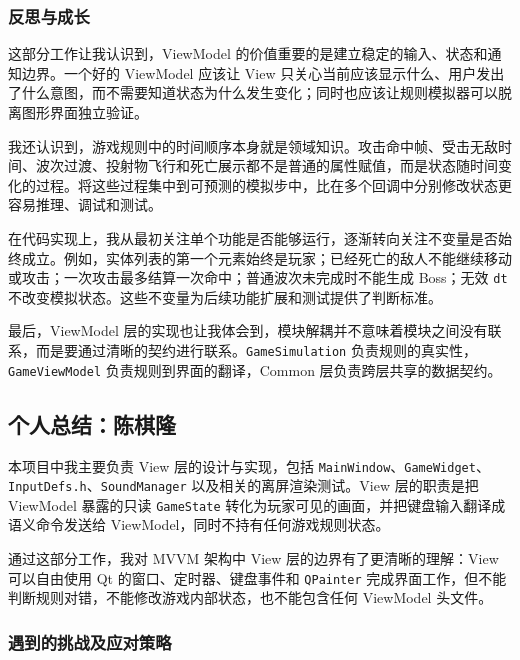 \documentclass[a4paper]{article}
\begin{document}
\subsubsection{反思与成长}
这部分工作让我认识到，ViewModel 的价值重要的是建立稳定的输入、状态和通知边界。一个好的 ViewModel 应该让 View 只关心当前应该显示什么、用户发出了什么意图，而不需要知道状态为什么发生变化；同时也应该让规则模拟器可以脱离图形界面独立验证。

我还认识到，游戏规则中的时间顺序本身就是领域知识。攻击命中帧、受击无敌时间、波次过渡、投射物飞行和死亡展示都不是普通的属性赋值，而是状态随时间变化的过程。将这些过程集中到可预测的模拟步中，比在多个回调中分别修改状态更容易推理、调试和测试。

在代码实现上，我从最初关注单个功能是否能够运行，逐渐转向关注不变量是否始终成立。例如，实体列表的第一个元素始终是玩家；已经死亡的敌人不能继续移动或攻击；一次攻击最多结算一次命中；普通波次未完成时不能生成 Boss；无效 \texttt{dt} 不改变模拟状态。这些不变量为后续功能扩展和测试提供了判断标准。

最后，ViewModel 层的实现也让我体会到，模块解耦并不意味着模块之间没有联系，而是要通过清晰的契约进行联系。\texttt{GameSimulation} 负责规则的真实性，\texttt{GameViewModel} 负责规则到界面的翻译，Common 层负责跨层共享的数据契约。

\subsection{个人总结：陈棋隆}

本项目中我主要负责 View 层的设计与实现，包括 \texttt{MainWindow}、\texttt{GameWidget}、\texttt{InputDefs.h}、\texttt{SoundManager} 以及相关的离屏渲染测试。View 层的职责是把 ViewModel 暴露的只读 \texttt{GameState} 转化为玩家可见的画面，并把键盘输入翻译成语义命令发送给 ViewModel，同时不持有任何游戏规则状态。

通过这部分工作，我对 MVVM 架构中 View 层的边界有了更清晰的理解：View 可以自由使用 Qt 的窗口、定时器、键盘事件和 \texttt{QPainter} 完成界面工作，但不能判断规则对错，不能修改游戏内部状态，也不能包含任何 ViewModel 头文件。

\subsubsection{遇到的挑战及应对策略}
\end{document}

